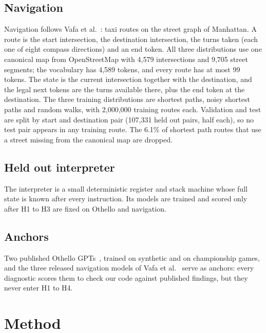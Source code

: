 \documentclass[journal]{IEEEtran}
\begin{document}
\subsection{Navigation}
Navigation follows Vafa et al.~\cite{vafa2024evaluating}: taxi routes on the street graph of Manhattan. A route is
the start intersection, the destination intersection, the turns taken (each one of eight compass directions) and an
end token. All three distributions use one canonical map from OpenStreetMap with 4,579 intersections and 9,705
street segments; the vocabulary has 4,589 tokens, and every route has at most 99 tokens. The state is the current
intersection together with the destination, and the legal next tokens are the turns available there, plus the end
token at the destination. The three training distributions are shortest paths, noisy shortest paths and random
walks, with 2,000,000 training routes each. Validation and test are split by start and destination pair (107,331
held out pairs, half each), so no test pair appears in any training route. The 6.1\% of shortest path routes that
use a street missing from the canonical map are dropped.

\subsection{Held out interpreter}
The interpreter is a small deterministic register and stack machine whose full state is known after every
instruction. Its models are trained and scored only after H1 to H3 are fixed on Othello and navigation.

\subsection{Anchors}
Two published Othello GPTs~\cite{li2023othello}, trained on synthetic and on championship games, and the three
released navigation models of Vafa et al.~\cite{vafa2024evaluating} serve as anchors: every diagnostic scores them
to check our code against published findings, but they never enter H1 to H4.

\section{Method}
\label{sec:method}
\end{document}

